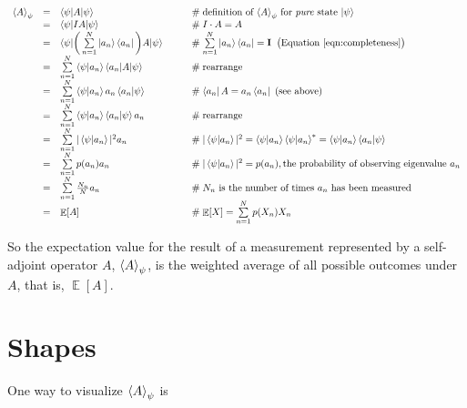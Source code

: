 \documentclass[11pt, oneside]{article}   	%
\DeclareMathOperator{\E}{\mathbb{E}}
\begin{document}
\begin{equation*}
\begin{array}{rcll}
\braket{A}_{\psi} 
&=& \braket{\psi |A | \psi}                             
    & \qquad \mathrel{\#} \text{definition of $\braket{A}_{\psi}$ for \emph{pure} state $\ket{\psi}$} \\
&=& \braket{\psi  | IA | \psi}                             
    & \qquad \mathrel{\#} I \cdot A = A \\
&=& \braket{\psi | \bigg (\sum\limits_{n = 1}^{N} \ket{a_n} \bra{a_n} \bigg ) A | \psi}                      
    & \qquad \mathrel{\#} \sum\limits_{n = 1}^{N} \ket{a_n} \bra{a_n} = \mathbf{I} \;\;  \text{\big (Equation \ref{eqn:completeness}} \big ) \\
&=& \sum\limits_{n = 1}^{N} \braket{\psi | a_n} \braket{a_n | A | \psi}                 
     & \qquad \mathrel{\#} \text{rearrange} \\
&=& \sum\limits_{n = 1}^{N} \braket{\psi | a_n} a_n   \braket{a_n | \psi}
    & \qquad \mathrel{\#}  \bra{a_n} A = a_n \bra{a_n} \text{ (see above)} \\
&=& \sum\limits_{n = 1}^{N} \braket{\psi | a_n}  \braket{a_n | \psi} a_n
    & \qquad \mathrel{\#}  \text{rearrange} \\
&=& \sum\limits_{n = 1}^{N} | \braket{\psi | a_n}|^2  a_n
    & \qquad \mathrel{\#} |\braket{\psi | a_n}|^2  = \braket{\psi | a_n}  \braket{\psi | a_n}^*  = \braket{\psi | a_n}  \braket{a_n | \psi}  \\
&=& \sum\limits_{n = 1}^{N} p(a_n)  a_n
    & \qquad \mathrel{\#}  |\braket{\psi | a_n}|^2 = p(a_n),  \text{the probability of observing eigenvalue $a_n$} \\
&=& \sum\limits_{n = 1}^{N} \frac{N_n}{N}  a_n
    & \qquad \mathrel{\#}  \text{$N_n$ is the number of times $a_n$  has been measured} \\
&=& \E [A]
    & \qquad \mathrel{\#}  \E [X] = \sum\limits_{n = 1}^{N} p(X_n) X_n
\end{array}
\end{equation*}

\bigskip
\noindent
So the expectation value for the result of a measurement represented by a self-adjoint operator $A$, $\braket{A}_{\psi}$,
 is the weighted average of all possible outcomes under $A$, that is, $\E [A]$.

\section{Shapes}
\label{sec:shapes}
One way to visualize $\braket{A}_{\psi}$ is
\end{document}
